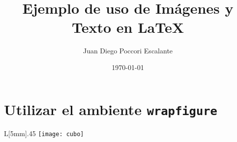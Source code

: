 \documentclass{article}
\title{Ejemplo de uso de Imágenes y Texto en \LaTeX}
\author{Juan Diego Poccori Escalante}
\date{\today}
\begin{document}
    \maketitle
    \renewcommand{\contentsname}{Tabla de contenido}
    \renewcommand{\listfigurename}{Lista de Figuras}
    \renewcommand{\figurename}{Fig.}
    \tableofcontents
    \listoffigures

    \section{Utilizar el ambiente \texttt{wrapfigure}}
    \begin{wrapfigure}[10]{L}[5mm]{.45\textwidth}
        \centering
        \texttt{[image: cubo]}

    \end{wrapfigure}

    
\end{document}
